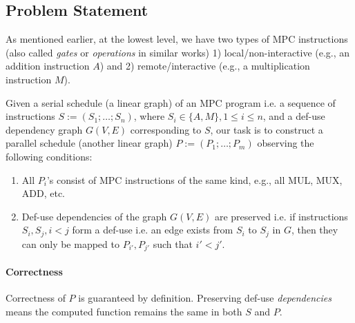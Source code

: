 \subsection{Problem Statement}
\label{sec:problem}


As mentioned earlier, at the lowest level, we have two types of MPC instructions (also called \emph{gates} or \emph{operations} in similar works) 1) local/non-interactive (e.g., an addition instruction $A$) and 2) remote/interactive (e.g., a multiplication instruction $M$). %


Given a serial schedule (a linear graph) of an MPC program i.e. a sequence of instructions $S := (S_1; \dots; S_n)$, where $S_i \in \{A, M\}, 1 \leq i \leq n$, and a def-use dependency graph $G(V, E)$ corresponding to $S$, our task is to construct a parallel schedule (another linear graph) $P := (P_1; \dots; P_m)$ observing the following conditions:

\begin{enumerate}
    \item All $P_i$'s consist of MPC instructions of the same kind, e.g., all MUL, MUX, ADD, etc. 
    \item Def-use dependencies of the graph $G(V, E)$ are preserved i.e. if instructions $S_i, S_j, i < j$ form a def-use i.e. an edge exists from $S_i$ to $S_j$ in $G$, then they can only be mapped to $P_{i'}, P_{j'}$ such that $i' < j'$.
\end{enumerate}

\paragraph{Correctness} Correctness of $P$ is guaranteed by definition. Preserving def-use \emph{dependencies} means the computed function remains the same in both $S$ and $P$.

